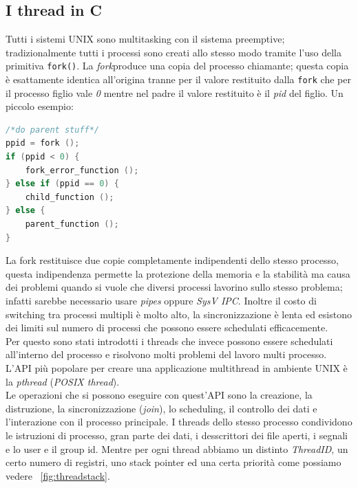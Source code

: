 \subsection{I thread in C}
Tutti i sistemi UNIX sono multitasking con il sistema preemptive; tradizionalmente tutti i processi sono creati allo stesso modo tramite l'uso della primitiva \texttt{fork()}. La \emph{fork}produce una copia del processo chiamante; questa copia è esattamente identica all'origina tranne per il valore restituito dalla \texttt{fork} che per il processo figlio vale \emph{0} mentre nel padre il valore restituito è il \emph{pid} del figlio. Un piccolo esempio:
\begin{lstlisting}[language=C,float=htb,captionpos=b,caption={Esempio di uso della fork},label=lst:fork]
/*do parent stuff*/
ppid = fork ();
if (ppid < 0) {
	fork_error_function ();
} else if (ppid == 0) {
	child_function ();
} else {
	parent_function ();
}
\end{lstlisting}
La fork restituisce due copie completamente indipendenti dello stesso processo, questa indipendenza permette la protezione della memoria e la stabilità ma causa dei problemi quando si vuole che diversi processi lavorino sullo stesso problema; infatti sarebbe necessario usare \emph{pipes} oppure \emph{SysV IPC}. Inoltre il costo di switching tra processi multipli è molto alto, la sincronizzazione è lenta ed esistono dei limiti sul numero di processi che possono essere schedulati efficacemente.\\
Per questo sono stati introdotti i threads che invece possono essere schedulati all'interno del processo e risolvono molti problemi del lavoro multi processo.
L'API più popolare per creare una applicazione multithread in ambiente UNIX è la \emph{pthread} (\emph{POSIX thread}).\\
Le operazioni che si possono eseguire con quest'API sono la creazione, la distruzione, la sincronizzazione (\emph{join}), lo scheduling, il controllo dei dati e l'interazione con il processo principale. I threads dello stesso processo condividono le istruzioni di processo, gran parte dei dati, i desscrittori dei file aperti, i segnali e lo user e il group id. Mentre per ogni thread abbiamo un distinto \emph{ThreadID}, un certo numero di registri, uno stack pointer ed una certa priorità come possiamo vedere \figurename~\ref{fig:threadstack}.
